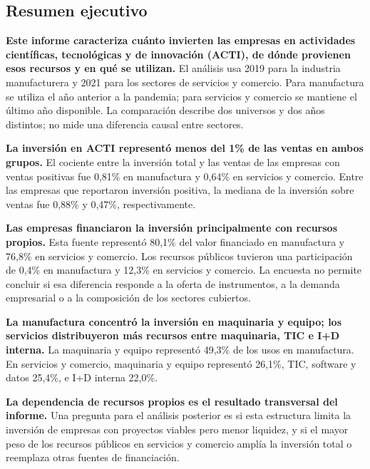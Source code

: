 \documentclass[12pt,a4paper]{article}
\begin{document}
\begin{mdframed}[
  linewidth=1pt,
  linecolor=gray!60,
  backgroundcolor=gray!6,
  innertopmargin=12pt,
  innerbottommargin=12pt,
  innerleftmargin=14pt,
  innerrightmargin=14pt
]
\section*{Resumen ejecutivo}

\textbf{Este informe caracteriza cuánto invierten las empresas en actividades científicas, tecnológicas y de innovación (ACTI), de dónde provienen esos recursos y en qué se utilizan.} El análisis usa 2019 para la industria manufacturera y 2021 para los sectores de servicios y comercio. Para manufactura se utiliza el año anterior a la pandemia; para servicios y comercio se mantiene el último año disponible. La comparación describe dos universos y dos años distintos; no mide una diferencia causal entre sectores.

\textbf{La inversión en ACTI representó menos del 1\% de las ventas en ambos grupos.} El cociente entre la inversión total y las ventas de las empresas con ventas positivas fue 0,81\% en manufactura y 0,64\% en servicios y comercio. Entre las empresas que reportaron inversión positiva, la mediana de la inversión sobre ventas fue 0,88\% y 0,47\%, respectivamente.

\textbf{Las empresas financiaron la inversión principalmente con recursos propios.} Esta fuente representó 80,1\% del valor financiado en manufactura y 76,8\% en servicios y comercio. Los recursos públicos tuvieron una participación de 0,4\% en manufactura y 12,3\% en servicios y comercio. La encuesta no permite concluir si esa diferencia responde a la oferta de instrumentos, a la demanda empresarial o a la composición de los sectores cubiertos.

\textbf{La manufactura concentró la inversión en maquinaria y equipo; los servicios distribuyeron más recursos entre maquinaria, TIC e I+D interna.} La maquinaria y equipo representó 49,3\% de los usos en manufactura. En servicios y comercio, maquinaria y equipo representó 26,1\%, TIC, software y datos 25,4\%, e I+D interna 22,0\%.

\textbf{La dependencia de recursos propios es el resultado transversal del informe.} Una pregunta para el análisis posterior es si esta estructura limita la inversión de empresas con proyectos viables pero menor liquidez, y si el mayor peso de los recursos públicos en servicios y comercio amplía la inversión total o reemplaza otras fuentes de financiación.
\end{mdframed}

\newpage
\tableofcontents
\newpage


\end{document}
